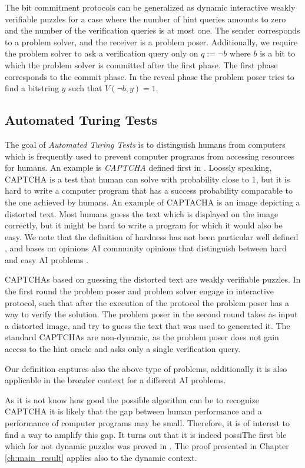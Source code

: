 The bit commitment protocols can be generalized as dynamic interactive weakly verifiable puzzles for a
case where the number of hint queries amounts to zero and the number of the verification queries is at most one.
The sender corresponds to a problem solver, and the receiver is a problem poser.
Additionally, we require the problem solver to ask a verification query only on $q := \lnot b$ where $b$
is a bit to which the problem solver is committed after the first phase.
The first phase corresponds to the commit phase.
In the reveal phase the problem poser tries to find a bitstring $y$ such that $V(\lnot b, y) = 1$.

\subsection{Automated Turing Tests}
The goal of \textit{Automated Turing Tests} is to distinguish humans from computers which
is frequently used to prevent computer programs from accessing resources for humans.
An example is \textit{CAPTCHA} defined first in \cite{von2003captcha}.
Loossly speaking, CAPTCHA is a test that human can solve with probability close to 1, but it is hard to write a computer program
that has a success probability comparable to the one achieved by humans.
An example of CAPTACHA is an image depicting a distorted text. Most humans guess the text which is displayed on the image correctly, but it might be hard to write
a program for which it would also be easy. We note that the definition of hardness has not been particular well defined ,
and bases on opinions AI community opinions that distinguish between hard and easy AI problems \cite{von2003captcha}.

CAPTCHAs based on guessing the distorted text are weakly verifiable puzzles.
In the first round the problem poser and problem solver engage in interactive protocol, such that
after the execution of the protocol the problem poser has a way to verify the solution.
The problem poser in the second round takes as input a distorted image, and try to guess the text that was used to generated it.
The standard CAPTCHAs are non-dynamic, as the problem poser does not gain access to the hint oracle and
asks only a single verification query.

Our definition captures also the above type of problems, additionally it is also applicable in the broader context for a different
AI problems.

As it is not know how good the possible algorithm can be to recognize CAPTCHA it is likely that the gap between human
performance and a performance of computer programs may be small. Therefore, it is of interest to find a way to amplify this gap.
It turns out that it is indeed possiThe first ble which for not dynamic puzzles was proved in \cite{DBLP:journals/corr/abs-1002-3534}.
The proof presented in Chapter \ref{ch:main_result} applies also to the dynamic context.

